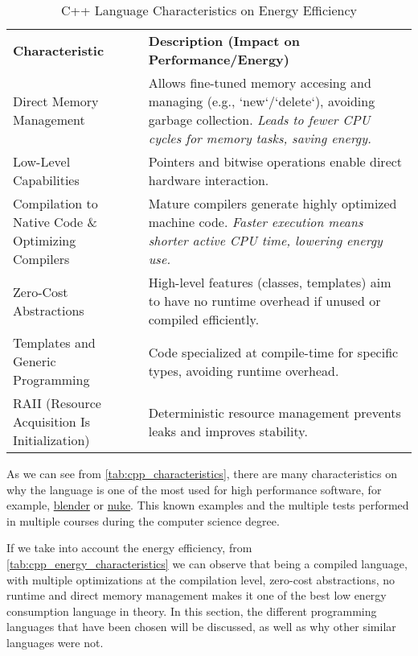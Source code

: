 \begin{table}[h]
	\centering
	\caption{C++ Language Characteristics on Energy Efficiency}
    \label{tab:cpp_energy_characteristics}
	\begin{tabular}{>{\raggedright\arraybackslash}p{} >{\raggedright\arraybackslash}p{}}
		\multicolumn{2}{c}{\textbf{Characteristics Impacting Performance \& Energy Efficiency}} \\
		\midrule
		\textbf{Characteristic}                            & \textbf{Description (Impact on Performance/Energy)}\\
		\midrule
		Direct Memory Management                           & Allows fine-tuned memory accesing and managing (e.g., `new`/`delete`), avoiding garbage collection. \textit{Leads to fewer CPU cycles for memory tasks, saving energy.}\\
		\addlinespace
		Low-Level Capabilities                             & Pointers and bitwise operations enable direct hardware interaction. \\
		\addlinespace
		Compilation to Native Code \& Optimizing Compilers & Mature compilers generate highly optimized machine code. \textit{Faster execution means shorter active CPU time, lowering energy use.}\\
		\addlinespace
		Zero-Cost Abstractions                             & High-level features (classes, templates) aim to have no runtime overhead if unused or compiled efficiently.\\
		\addlinespace
		Templates and Generic Programming                  & Code specialized at compile-time for specific types, avoiding runtime overhead.\\
		\addlinespace
		RAII (Resource Acquisition Is Initialization)      & Deterministic resource management prevents leaks and improves stability.\\
		\bottomrule
	\end{tabular}
\end{table}

As we can see from \autoref{tab:cpp_characteristics}, there are many characteristics on why the language is one of the most used for high performance software, for example, \href{https://blender.org}{blender} or \href{https://www.foundry.com/products/nuke-family}{nuke}. This known examples and the multiple tests performed in multiple courses during the computer science degree.

If we take into account the energy efficiency, from \autoref{tab:cpp_energy_characteristics} we can observe that being a compiled language, with multiple optimizations at the compilation level, zero-cost abstractions, no runtime and direct memory management makes it one of the best low energy consumption language in theory.
In this section, the different programming languages that have been chosen will be discussed, as well as why other similar languages were not.

